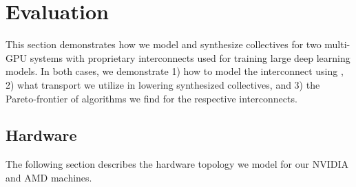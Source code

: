 
\section{Evaluation}
\label{sec:evaluation}


This section demonstrates how we model and synthesize collectives for
two multi-GPU systems with proprietary interconnects used for training large
deep learning models. In both cases, we
demonstrate 1) how to model the interconnect using \tool, 2) what
transport we utilize in lowering synthesized collectives, and 3) the
Pareto-frontier of algorithms we find for the respective
interconnects.

\subsection{Hardware}
The following section describes the hardware topology we model for our
NVIDIA and AMD machines.

